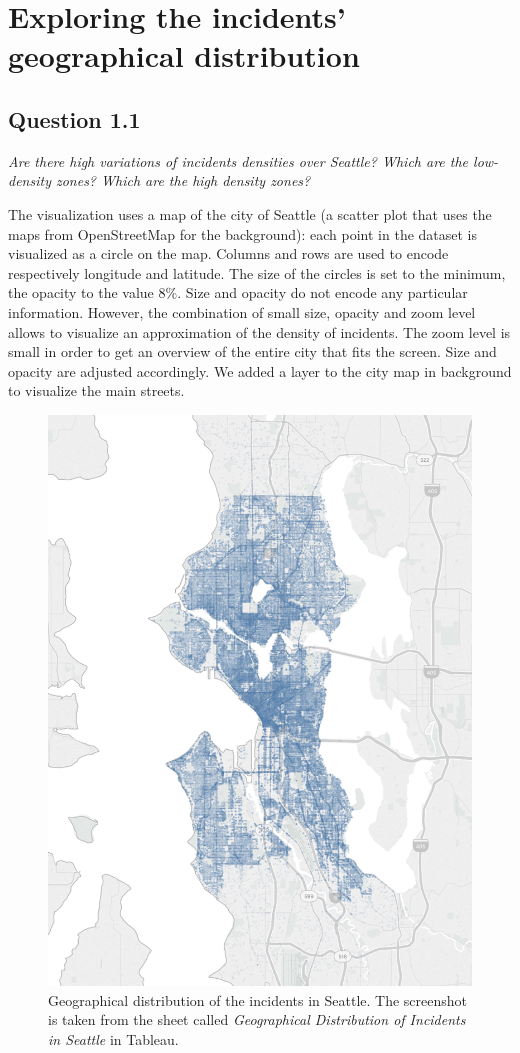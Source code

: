 \section{Exploring the incidents' geographical distribution}
\label{sec:question1}

\subsection*{Question 1.1}
\textit{Are there high variations of incidents densities over Seattle? Which are the low-density zones? Which are the high density zones?}

The visualization uses a map of the city of Seattle (a scatter plot that uses the maps from OpenStreetMap for the background):
each point in the dataset is visualized as a circle on the map.
Columns and rows are used to encode respectively longitude and latitude.
The size of the circles is set to the minimum, the opacity to the value $8\%$.
Size and opacity do not encode any particular information.
However, the combination of small size, opacity and zoom level allows to visualize an approximation of the density of incidents.
The zoom level is small in order to get an overview of the entire city that fits the screen.
Size and opacity are adjusted accordingly.
We added a layer to the city map in background to visualize the main streets.

\begin{figure}[H]
	\centering
	\includegraphics[width=.7\columnwidth]{figures/1_1_geographical_distribution_incidents}
	\caption{Geographical distribution of the incidents in Seattle. The screenshot is taken from the sheet called \textit{Geographical Distribution of Incidents in Seattle} in Tableau.}
	\label{fig:1_1_geographical_distribution_incidents}
\end{figure}

